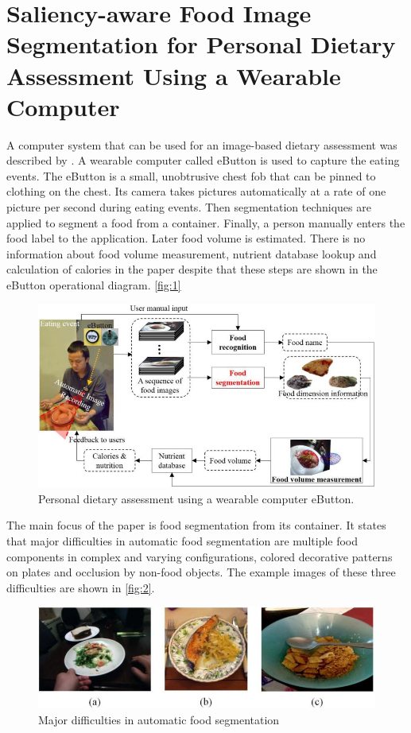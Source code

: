 \section{Saliency-aware Food Image Segmentation for Personal Dietary Assessment Using a Wearable Computer}
A computer system that can be used for an image-based dietary assessment was described by \cite{chen2015saliency}. A wearable computer called eButton is used to capture the eating events. The eButton is a small, unobtrusive chest fob that can be pinned to clothing on the chest. Its camera takes pictures automatically at a rate of one picture per second during eating events. Then segmentation techniques are applied to segment a food from a container. Finally, a person manually enters the food label to the application. Later food volume is estimated. There is no information about food volume measurement, nutrient database lookup and calculation of calories in the paper despite that these steps are shown in the eButton operational diagram. \autoref{fig:1}
\begin{figure}[ht]
\includegraphics{Figures/segm_01.jpg}
\caption{Personal dietary assessment using a wearable computer eButton. }
\label{fig:1}
\end{figure}

The main focus of the paper is food segmentation from its container. It states that major difficulties in automatic food segmentation are multiple food components in complex and varying configurations, colored decorative patterns on plates and occlusion by non-food objects. The example images of these three difficulties are shown in  \autoref{fig:2}.

\begin{figure}[ht]
\includegraphics{Figures/segm_02.jpg}
\caption{Major difficulties in automatic food segmentation }
\label{fig:2}
\end{figure}

